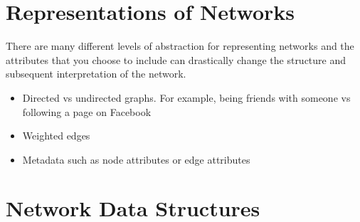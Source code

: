 \section{Representations of Networks}
There are many different levels of abstraction for representing networks and the attributes that you choose to include can drastically change the structure and subsequent interpretation of the network.
\begin{itemize}
	\item Directed vs undirected graphs. For example, being friends with someone vs following a page on Facebook
	\item Weighted edges
	\item Metadata such as node attributes or edge attributes
\end{itemize}

\section{Network Data Structures}
